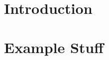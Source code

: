 \documentclass[
    twoside,
    parskip=full,
    footsepline,
    paper=7in:9in,
    toc=chapterentrydotfill,
    12pt]{scrbook}
\begin{document}
\frontmatter{}
    \maketitle
    
    \newpage
    
    \tableofcontents
    

\mainmatter{}
\pagestyle{scrheadings}
\chapter{Introduction}


\chapter{Example Stuff}

\end{document}
